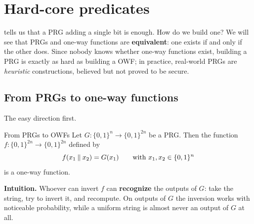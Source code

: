 
\section{Hard-core predicates}

 tells us that a PRG adding a single bit is enough. How do we build one? We will see that PRGs and one-way functions are \textbf{equivalent}: one exists if and only if the other does. Since nobody knows whether one-way functions exist, building a PRG is exactly as hard as building a OWF; in practice, real-world PRGs are \textit{heuristic} constructions, believed but not proved to be secure.

\subsection{From PRGs to one-way functions}

The easy direction first.

\begin{framedthm}[label={thm:prg-owf}]{From PRGs to OWFs}
  Let $G : \{0,1\}^n \to \{0,1\}^{2n}$ be a PRG. Then the function $f : \{0,1\}^{2n} \to \{0,1\}^{2n}$ defined by
  \[
    f(x_1 \mathbin{\Vert} x_2) = G(x_1) \qquad \text{with } x_1, x_2 \in \{0,1\}^n
  \]
  is a one-way function.
\end{framedthm}

\textbf{Intuition.} Whoever can invert $f$ can \textbf{recognize} the outputs of $G$: take the string, try to invert it, and recompute. On outputs of $G$ the inversion works with noticeable probability, while a uniform string is almost never an output of $G$ at all.

